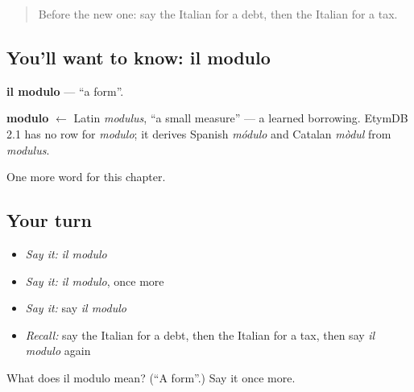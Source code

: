 \label{lesson:IT-C253-modulo}



\begin{quote}
Before the new one: say the Italian for a debt, then the Italian for a tax.
\end{quote}

\subsection*{You'll want to know: il modulo}
\textbf{il modulo} — \textquotedblleft{}a form\textquotedblright{}.

\begin{cousinweb}
\textbf{modulo} $\leftarrow$ Latin \emph{modulus}, \textquotedblleft{}a small measure\textquotedblright{} — a learned borrowing. EtymDB 2.1 has no row for \emph{modulo}; it derives Spanish \emph{módulo} and Catalan \emph{mòdul} from \emph{modulus}.
\end{cousinweb}

\begin{grammarlens}[title={What you've built}]
One more word for this chapter.
\end{grammarlens}

\subsection*{Your turn}
\begin{itemize}
\raggedright
  \item \emph{Say it:} \emph{il modulo}
  \item \emph{Say it:} \emph{il modulo}, once more
  \item \emph{Say it:} say \emph{il modulo}
  \item \emph{Recall:} say the Italian for a debt, then the Italian for a tax, then say \emph{il modulo} again
\end{itemize}

\begin{tcolorbox}[breakable,colback=teal!4,colframe=teal!35!black,title={Before you move on}]
What does il modulo mean? (\textquotedblleft{}A form\textquotedblright{}.) Say it once more.
\end{tcolorbox}

